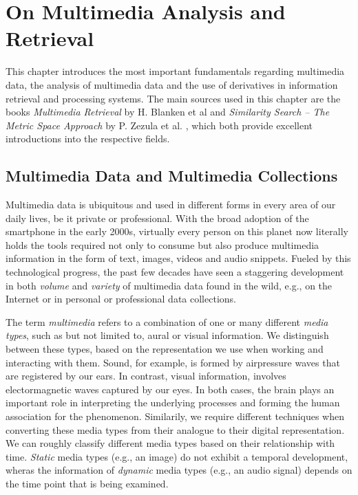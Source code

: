 \chapter{On Multimedia Analysis and Retrieval}
\label{chapter:theory_multimedia_analysis_and_retrieval}

This chapter introduces the most important fundamentals regarding multimedia data, the analysis of multimedia data and the use of derivatives in information retrieval and processing systems. The main sources used in this chapter are the books \emph{Multimedia Retrieval} by H. Blanken et al \cite{Blanken:2007multimedia} and \emph{Similarity Search -- The Metric Space Approach} by P. Zezula et al. \cite{Zezula:2006similarity}, which both provide excellent introductions into the respective fields.


\section{Multimedia Data and Multimedia Collections}
\label{section:multmedia_data}

Multimedia data is ubiquitous and used in different forms in every area of our daily lives, be it private or professional. With the broad adoption of the smartphone in the early 2000s, virtually every person on this planet now literally holds the tools required not only to consume but also produce multimedia information in the form of text, images, videos and audio snippets. Fueled by this technological progress, the past few decades have seen a staggering development in both \emph{volume} and \emph{variety} of multimedia data found in the wild, e.g., on the Internet or in personal or professional data collections. 

The term \emph{multimedia} refers to a combination of one or many different \emph{media types}, such as but not limited to, aural or visual information. We distinguish between these types, based on the representation we use when working and interacting with them. Sound, for example, is formed by airpressure waves that are registered by our ears. In contrast, visual information, involves electormagnetic waves captured by our eyes. In both cases, the brain plays an important role in interpreting the underlying processes and forming the human association for the phenomenon. Similarily, we require different techniques when converting these media types from their analogue to their digital representation. We can roughly classify different media types based on their relationship with time. \emph{Static} media types (e.g., an image) do not exhibit a temporal development, wheras the information of \emph{dynamic} media types (e.g., an audio signal) depends on the time point that is being examined. \cite{Blanken:2007multimedia}

